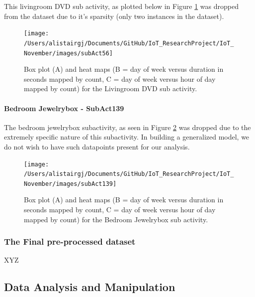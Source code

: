 \documentclass[11pt,]{article}
\let\oldparagraph\paragraph
\renewcommand{\paragraph}[1]{\oldparagraph{#1}\mbox{}}
\begin{document}
This livingroom DVD sub activity, as plotted below in Figure
\ref{fig:subAct56} was dropped from the dataset due to it's sparsity
(only two instances in the dataset).

\begin{figure}[H]

{\centering \texttt{[image: /Users/alistairgj/Documents/GitHub/IoT\_ResearchProject/IoT\_November/images/subAct56]} 

}

\caption{Box plot (A) and heat maps (B = day of week versus duration in seconds mapped by count, C = day of week versus hour of day mapped by count) for the Livingroom DVD sub activity.}\label{fig:subAct56}
\end{figure}

\hypertarget{bedroom-jewelrybox---subact139}{%
\paragraph{Bedroom Jewelrybox -
SubAct139}\label{bedroom-jewelrybox---subact139}}

The bedroom jewelrybox subactivity, as seen in Figure
\ref{fig:subAct139} was dropped due to the extremely specific nature of
this subactivity. In building a generalized model, we do not wish to
have such datapoints present for our analysis.

\begin{figure}[H]

{\centering \texttt{[image: /Users/alistairgj/Documents/GitHub/IoT\_ResearchProject/IoT\_November/images/subAct139]} 

}

\caption{Box plot (A) and heat maps (B = day of week versus duration in seconds mapped by count, C = day of week versus hour of day mapped by count) for the Bedroom Jewelrybox sub activity.}\label{fig:subAct139}
\end{figure}

\hypertarget{the-final-pre-processed-dataset}{%
\subsubsection{The Final pre-processed
dataset}\label{the-final-pre-processed-dataset}}

XYZ

\hypertarget{data-analysis-and-manipulation}{%
\subsection{Data Analysis and
Manipulation}\label{data-analysis-and-manipulation}}
\end{document}

